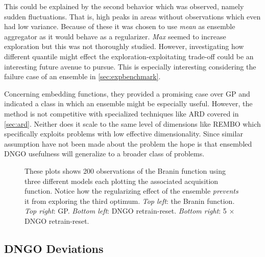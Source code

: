 \documentclass[conference,compsoc]{IEEEtran}
\theoremstyle{definition}
\begin{document}
        This could be explained by the second behavior which was observed, namely sudden fluctuations.
        That is, high peaks in areas without observations which even had low variance.
        Because of these it was chosen to use \emph{mean} as ensemble aggregator as it would behave as a regularizer.
        \emph{Max} seemed to increase exploration but this was not thoroughly studied.
        However, investigating how different quantile might effect the exploration-exploitating trade-off could be an interesting future avenue to pursue.
        This is especially interesting considering the failure case of an ensemble in \cref{sec:expbenchmark}.

        Concerning embedding functions, they provided a promising case over GP and indicated a class in which an ensemble might be especially useful.
        However, the method is not competitive with specialized techniques like ARD covered in \cref{sec:ard}.
        Neither does it scale to the same level of dimensions like REMBO \parencite{wang_bayesian_2013} which specifically exploits problems with low effective dimensionality.
        Since similar assumption have not been made about the problem the hope is that ensembled DNGO usefulness will generalize to a broader class of problems.

        \begin{figure}
            
            \caption{
            These plots shows 200 observations of the Branin function using three different models each plotting the associated acquisition function.
            Notice how the regularizing effect of the ensemble \emph{prevents} it from exploring the third optimum.
            \emph{Top left}: the Branin function. 
            \emph{Top right}: GP.
            \emph{Bottom left}: DNGO retrain-reset.
            \emph{Bottom right}: 5 $\times$ DNGO retrain-reset.}
            \label{fig:braningexploit}
        \end{figure}
        

    \subsection{DNGO Deviations}\label{sec:disc-diviations}
\end{document}

